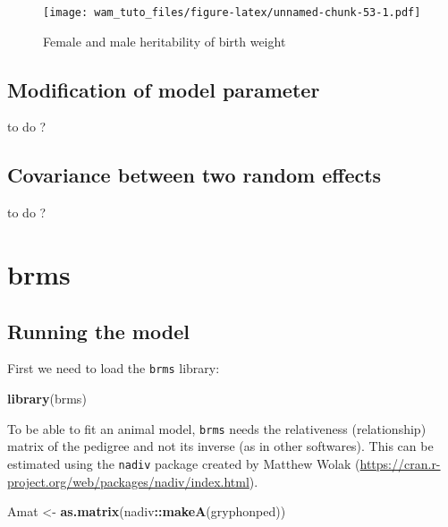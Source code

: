 \documentclass[
  12pt,
]{book}
\newenvironment{Shaded}{\begin{snugshade}}{\end{snugshade}}
\newcommand{\KeywordTok}[1]{\textcolor[rgb]{0.13,0.29,0.53}{\textbf{#1}}}
\newcommand{\NormalTok}[1]{#1}
\newcommand{\OperatorTok}[1]{\textcolor[rgb]{0.81,0.36,0.00}{\textbf{#1}}}
\newcommand{\StringTok}[1]{\textcolor[rgb]{0.31,0.60,0.02}{#1}}
\begin{document}
\begin{figure}
\centering
\texttt{[image: wam\_tuto\_files/figure-latex/unnamed-chunk-53-1.pdf]}
\caption{\label{fig:unnamed-chunk-53}Female and male heritability of birth weight}
\end{figure}

\hypertarget{modification-of-model-parameter}{%
\subsection{Modification of model parameter}\label{modification-of-model-parameter}}

to do ?

\hypertarget{covariance-between-two-random-effects-1}{%
\subsection{Covariance between two random effects}\label{covariance-between-two-random-effects-1}}

to do ?

\hypertarget{brms-1}{%
\section{brms}\label{brms-1}}

\hypertarget{running-the-model-2}{%
\subsection{Running the model}\label{running-the-model-2}}

First we need to load the \texttt{brms} library:

\begin{Shaded}
\begin{Highlighting}[]
\KeywordTok{library}\NormalTok{(brms)}
\end{Highlighting}
\end{Shaded}

To be able to fit an animal model, \texttt{brms} needs the relativeness (relationship) matrix of the pedigree and not its inverse (as in other softwares).
This can be estimated using the \texttt{nadiv} package created by Matthew Wolak (\url{https://cran.r-project.org/web/packages/nadiv/index.html}).

\begin{Shaded}
\begin{Highlighting}[]
\NormalTok{Amat \textless{}{-}}\StringTok{ }\KeywordTok{as.matrix}\NormalTok{(nadiv}\OperatorTok{::}\KeywordTok{makeA}\NormalTok{(gryphonped))}
\end{Highlighting}
\end{Shaded}
\end{document}
